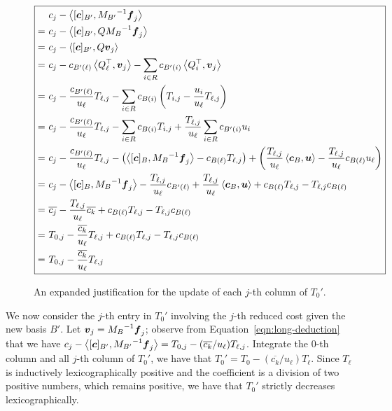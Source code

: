 \begin{figure}[t]
  \centering
\begin{equation}\label{eqn:long-deduction}
\boxed{\begin{split}
         & c_j - \left\langle[{\boldsymbol c}]_{B'}, {M_{B'}}^{-1} {\boldsymbol f}_j\right\rangle \\
         =~ &  c_j - \left\langle[{\boldsymbol c}]_{B'}, Q{M_{B}}^{-1} {\boldsymbol f}_j\right\rangle \\
        =~ &  c_j - \left\langle[{\boldsymbol c}]_{B'}, Q {\boldsymbol v}_j\right\rangle \\ 
        =~ &  c_j - c_{B'(\ell)} \left\langle Q_\ell^\top, {\boldsymbol v}_j\right\rangle - \sum_{i\in R} c_{B'(i)} \left\langle Q_i^\top, {\boldsymbol v}_j\right\rangle \\
        =~ &  c_j - \frac{c_{B'(\ell)}}{u_\ell} T_{\ell, j} - \sum_{i\in R} c_{B(i)} \left(T_{i, j} - \frac{u_i}{u_\ell} T_{\ell, j} \right) \\
        =~ &  c_j - \frac{c_{B'(\ell)}}{u_\ell} T_{\ell, j} - \sum_{i\in R} c_{B(i)} T_{i, j} + \frac{T_{\ell, j}}{u_\ell} \sum_{i\in R} c_{B'(i)} u_i \\
        =~ &  c_j - \frac{c_{B'(\ell)}}{u_\ell} T_{\ell, j} 
        - \left( \left\langle[{\boldsymbol c}]_{B}, {M_B}^{-1} {\boldsymbol f}_j\right\rangle - c_{B(\ell)}T_{\ell, j} \right)
        + \left( \frac{T_{\ell, j}}{u_\ell} \left\langle{\boldsymbol c}_B, {\boldsymbol u}\right\rangle - \frac{T_{\ell, j}}{u_\ell}c_{B(\ell)}u_\ell\right)\\
        =~ &  c_j - \left\langle[{\boldsymbol c}]_{B}, {M_B}^{-1} {\boldsymbol f}_j\right\rangle - \frac{ T_{\ell, j} }{u_\ell}c_{B'(\ell)} + \frac{T_{\ell, j}}{u_\ell} \left\langle{\boldsymbol c}_B, {\boldsymbol u}\right\rangle + c_{B(\ell)}T_{\ell, j}  - T_{\ell, j}c_{B(\ell)} \\
        =~ &  \overline{c_j} - \frac{ T_{\ell, j} }{u_\ell}\overline{c_k} + c_{B(\ell)}T_{\ell, j}  - T_{\ell, j}c_{B(\ell)} \\
        =~ &  T_{0, j} - \frac{ \overline{c_k} }{u_\ell} T_{\ell, j} + c_{B(\ell)}T_{\ell, j}   - T_{\ell, j}c_{B(\ell)}  \\
        =~ &  T_{0, j} - \frac{ \overline{c_k} }{u_\ell} T_{\ell, j} 
        \end{split}}
\end{equation}
        \caption{An expanded justification for the update of each $j$-th column of $T_0'$. }
\end{figure}

We now consider the $j$-th entry in $T_0'$ involving the $j$-th reduced cost given the new basis $B'$. Let ${\boldsymbol v}_j = {M_{B}}^{-1} {\boldsymbol f}_j$; observe from Equation~\ref{eqn:long-deduction} that we have $c_j - \left\langle[{\boldsymbol c}]_{B'}, {M_{B'}}^{-1} {\boldsymbol f}_j\right\rangle =  T_{0, j} - ( \overline{c_k} / u_\ell) T_{\ell, j} $. Integrate the 0-th column and all $j$-th column of $T_0'$, we have that $T_0' = T_0 - (\overline{c_k}/u_\ell) T_{\ell}$. Since $T_\ell$ is inductively lexicographically positive and the coefficient is a division of two positive numbers, which remains positive, we have that $T_0'$ strictly decreases lexicographically.   

